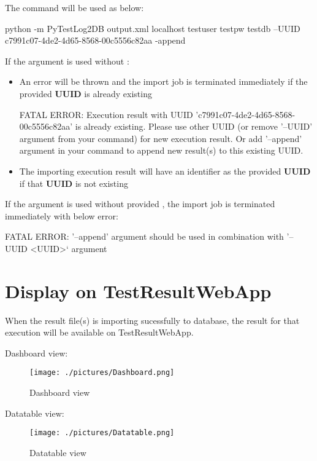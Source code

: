 The command will be used as below:

\begin{robotlog}
python -m PyTestLog2DB output.xml localhost testuser testpw testdb --UUID c7991c07-4de2-4d65-8568-00c5556c82aa -append
\end{robotlog}

If the argument  is used without :

\begin{itemize}
\item
  An error will be thrown and the import job is terminated immediately
  if the provided \textbf{UUID} is already existing

\begin{robotlog}
FATAL ERROR: Execution result with UUID 'c7991c07-4de2-4d65-8568-00c5556c82aa' is already existing.
             Please use other UUID (or remove '--UUID' argument from your command) for new execution result.
             Or add '--append' argument in your command to append new result(s) to this existing UUID.
\end{robotlog}
\item
  The importing execution result will have an identifier as the provided
  \textbf{UUID} if that \textbf{UUID} is not existing
\end{itemize}

If the argument  is used without provided , 
the import job is terminated immediately with below error: 

\begin{robotlog}
FATAL ERROR: '--append' argument should be used in combination with '--UUID <UUID>` argument
\end{robotlog}

\newpage
\hypertarget{display-on-testresultwebapp}{%
\section{Display on
TestResultWebApp}\label{display-on-testresultwebapp}}

When the result file(s) is importing sucessfully to database, the result
for that execution will be available on TestResultWebApp.

Dashboard view:

\begin{figure}[h!]
  \texttt{[image: ./pictures/Dashboard.png]}
  \caption{Dashboard view}
\end{figure}

Datatable view:

\begin{figure}[h!]
  \texttt{[image: ./pictures/Datatable.png]}
  \caption{Datatable view}
\end{figure}

